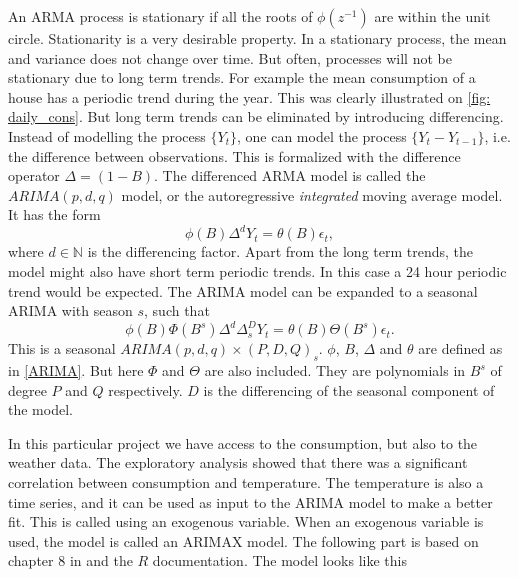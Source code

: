 \noindent An ARMA process is stationary if all the roots of $\phi(z^{-1})$ are within the unit circle. Stationarity is a very desirable property. In a stationary process, the mean and variance does not change over time. But often, processes will not be stationary due to long term trends. For example the mean consumption of a house has a periodic trend during the year. This was clearly illustrated on \cref{fig: daily_cons}. But long term trends can be eliminated by introducing differencing. Instead of modelling the process $\{Y_t\}$, one can model the process $\{Y_t - Y_{t-1}\}$, i.e. the difference between observations. This is formalized with the difference operator $\Delta = (1-B)$. The differenced ARMA model is called the $ARIMA(p,d,q)$ model, or the autoregressive \textit{integrated} moving average model. It has the form
\begin{equation}
    \phi (B) \Delta^d Y_t = \theta (B) \epsilon_t,
    \label{ARIMA}
\end{equation}
where $d\in \mathbb{N}$ is the differencing factor. Apart from the long term trends, the model might also have short term periodic trends. In this case a 24 hour periodic trend would be expected. The ARIMA model can be expanded to a seasonal ARIMA with season $s$, such that
\begin{equation}
    \phi (B) \Phi (B^s) \Delta^d \Delta_s^D Y_t = \theta (B) \Theta (B^s) \epsilon_t.
    \label{eq:ARIMA}
\end{equation}
This is a seasonal $ARIMA(p,d,q)\times (P,D,Q)_s$. $\phi$, $B$, $\Delta$ and $\theta$ are defined as in \cref{ARIMA}. But here $\Phi$ and $\Theta$ are also included. They are polynomials in $B^s$ of degree $P$ and $Q$ respectively. $D$ is the differencing of the seasonal component of the model. 

\noindent In this particular project we have access to the consumption, but also to the weather data. The exploratory analysis showed that there was a significant correlation between consumption and temperature. The temperature is also a time series, and it can be used as input to the ARIMA model to make a better fit. This is called using an exogenous variable. When an exogenous variable is used, the model is called an ARIMAX model. The following part is based on chapter $8$ in \cite{Time_Series_Analysis} and the $R$ documentation. The model looks like this


